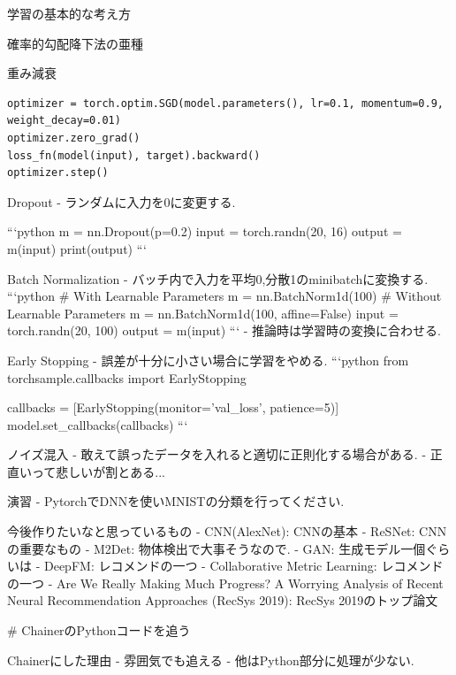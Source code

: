 \begin{frame}[fragile]{学習の基本的な考え方}
\begin{frame}[fragile]{確率的勾配降下法の亜種}
\begin{frame}[fragile]{重み減衰}
\begin{verbatim}
optimizer = torch.optim.SGD(model.parameters(), lr=0.1, momentum=0.9, weight_decay=0.01)
optimizer.zero_grad()
loss_fn(model(input), target).backward()
optimizer.step()
\end{verbatim}
\end{frame}


\begin{frame}[fragile]{}Dropout
- ランダムに入力を0に変更する.

```python
m = nn.Dropout(p=0.2)
input = torch.randn(20, 16)
output = m(input)
print(output)
```
\end{frame}
\begin{frame}[fragile]{}Batch Normalization
- バッチ内で入力を平均0,分散1のminibatchに変換する.
```python
# With Learnable Parameters
m = nn.BatchNorm1d(100)
# Without Learnable Parameters
m = nn.BatchNorm1d(100, affine=False)
input = torch.randn(20, 100)
output = m(input)
```
- 推論時は学習時の変換に合わせる.

\end{frame}
\begin{frame}[fragile]{}Early Stopping
- 誤差が十分に小さい場合に学習をやめる.
```python
from torchsample.callbacks import EarlyStopping

callbacks = [EarlyStopping(monitor='val_loss', patience=5)]
model.set_callbacks(callbacks)
```
\end{frame}
\begin{frame}[fragile]{}ノイズ混入
- 敢えて誤ったデータを入れると適切に正則化する場合がある.
- 正直いって悲しいが割とある...

\end{frame}
\begin{frame}[fragile]{}演習
- PytorchでDNNを使いMNISTの分類を行ってください.

\end{frame}
\begin{frame}[fragile]{}今後作りたいなと思っているもの
- CNN(AlexNet): CNNの基本
- ReSNet: CNNの重要なもの
- M2Det: 物体検出で大事そうなので.
- GAN: 生成モデル一個ぐらいは
- DeepFM: レコメンドの一つ
- Collaborative Metric Learning: レコメンドの一つ
- Are We Really Making Much Progress? A Worrying Analysis of Recent Neural Recommendation Approaches (RecSys 2019): RecSys 2019のトップ論文


# ChainerのPythonコードを追う

\end{frame}
\begin{frame}[fragile]{}Chainerにした理由
- 雰囲気でも追える
- 他はPython部分に処理が少ない.


\end{frame}
\end{frame}
\end{frame}
